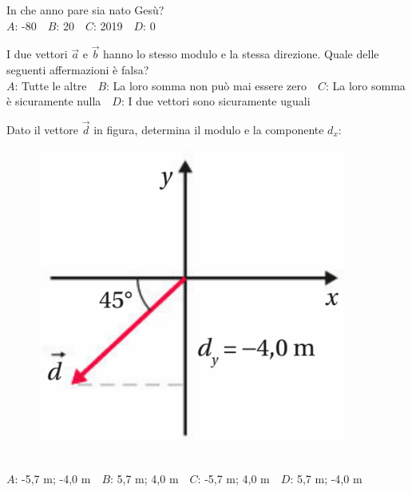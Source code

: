 \mcquestionfooter



\mcpaperfooter

\def\mcserialnumber{37}
\mcpaperheader


\def\mcquestionnumber{1}


\mcquestionheader In che anno pare sia nato Gesù?\\
{$A$}: -80\ \ {$B$}: 20\ \ {$C$}: 2019\ \ {$D$}: 0\ \ 

\mcquestionfooter



\def\mcquestionnumber{2}


\mcquestionheader I due vettori $\vec{a}$ e $\vec{b}$ hanno lo stesso modulo e la stessa direzione. Quale delle seguenti affermazioni è falsa?\\
{$A$}: Tutte le altre\ \ {$B$}: La loro somma non può mai essere zero\ \ {$C$}: La loro somma è sicuramente nulla\ \ {$D$}: I due vettori sono sicuramente uguali\ \ 

\mcquestionfooter



\def\mcquestionnumber{3}


\mcquestionheader Dato il vettore $\vec{d}$ in figura, determina il modulo e la componente $d_x$: \begin{figure}[h!]   \begin{center}     \includegraphics[scale=0.35]{vettored.png}   \end{center} \end{figure}\\
{$A$}: -5,7 m; -4,0 m\ \ {$B$}: 5,7 m; 4,0 m\ \ {$C$}: -5,7 m; 4,0 m\ \ {$D$}: 5,7 m; -4,0 m\ \ 

